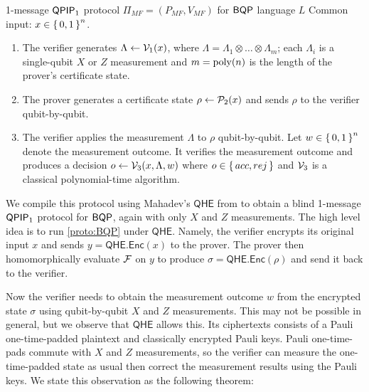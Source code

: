 \begin{protocol}{1-message $\operatorname{\mathsf{QPIP}}_1$ protocol $\Pi_{MF} = (P_{MF}, V_{MF})$ for $\operatorname{\mathsf{BQP}}$ language $L$ }
	\label{proto:BQP}
	Common input: $x\in\set{0,1}^n$. 
	\begin{enumerate}
		\item The verifier generates $\Lambda \leftarrow \mathcal{V}_1(x)$, where $\Lambda=\Lambda_1\otimes\ldots\otimes\Lambda_m$; each $\Lambda_i$ is a single-qubit $X$ or $Z$ measurement and $m=\operatorname*{\operatorname{poly}}(n)$ is the length of the prover's certificate state.
		\item The prover generates a certificate state $\rho\leftarrow\mathcal{P}_2(x)$  and sends $\rho$ to the verifier qubit-by-qubit.
		\item The verifier applies the measurement $\Lambda$ to $\rho$ qubit-by-qubit. Let $w \in \set{0,1}^n$ denote the measurement outcome. It verifies the measurement outcome and produces a decision  $o\leftarrow\mathcal{V}_3(x, \Lambda, w)$ where $o\in\set{acc, rej}$ and $\mathcal{V}_3$ is a classical polynomial-time algorithm.
	\end{enumerate}
\end{protocol}

We compile this protocol using Mahadev's $\mathsf{QHE}$ from \cite{mahadev_qfhe} to obtain a blind 1-message $\operatorname{\mathsf{QPIP}}_1$ protocol for $\operatorname{\mathsf{BQP}}$, again with only $X$ and $Z$ measurements.
The high level idea is to run \cref{proto:BQP} under $\mathsf{QHE}$.
Namely, the verifier encrypts its original input $x$ and sends $y=\mathsf{QHE.Enc}(x)$ to the prover.
The prover then homomorphically evaluate $\mathcal{F}$ on $y$ to produce $\sigma=\mathsf{QHE.Enc}(\rho)$  and send it back to the verifier.

Now the verifier needs to obtain the measurement outcome $w$ from the encrypted state $\sigma$ using qubit-by-qubit $X$ and $Z$ measurements.
This may not be possible in general, but we observe that $\mathsf{QHE}$ allows this. 
Its ciphertexts consists of a Pauli one-time-padded plaintext and classically encrypted Pauli keys.
Pauli one-time-pads commute with $X$ and $Z$ measurements, so the verifier can measure the one-time-padded state as usual then correct the measurement results using the Pauli keys.
We state this observation as the following theorem:


